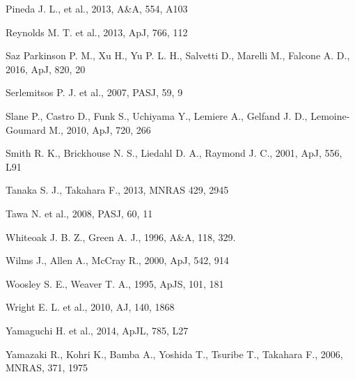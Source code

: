 \documentclass[useAMS,usenatbib]{mn2e}
\begin{document}
\begin{thebibliography}{99}
 Pineda J. L., et al., 2013, A\&A, 554, A103

 Reynolds M. T. et al., 2013, ApJ, 766, 112

 Saz Parkinson P. M., Xu H., Yu P. L. H., Salvetti D., Marelli M., Falcone A. D., 2016, ApJ, 820, 20

 Serlemitsos P. J. et al., 2007, PASJ, 59, 9

 Slane P., Castro D., Funk S., Uchiyama Y., Lemiere A., Gelfand J. D., Lemoine-Goumard M., 2010, ApJ, 720, 266

Smith R. K., Brickhouse N. S., Liedahl D. A., Raymond J. C., 2001, ApJ, 556, L91

 Tanaka S. J., Takahara F., 2013, MNRAS 429, 2945

 Tawa N. et al., 2008, PASJ, 60, 11

 Whiteoak J. B. Z., Green A. J., 1996, A\&A, 118, 329.

Wilms J., Allen A., McCray R., 2000, ApJ, 542, 914

 Woosley S. E., Weaver T. A., 1995, ApJS, 101, 181

Wright E. L. et al., 2010, AJ, 140, 1868

Yamaguchi H. et al., 2014, ApJL, 785, L27

Yamazaki R., Kohri K., Bamba A., Yoshida T., Tsuribe T., Takahara F.,
2006, MNRAS, 371, 1975

\end{thebibliography}


\onecolumn

\twocolumn

\end{document}
